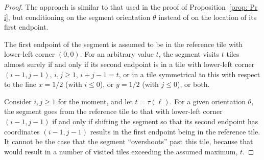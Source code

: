 \documentclass[12pt, a4paper]{article}
\newcommand{\funt}{\tau} %
\newcommand{\len}{\ell} %
\newcommand{\tiles}{t} %
\begin{document}
\begin{proof}
The approach is similar to that used in the proof of Proposition~\ref{prop: Pr i}, but conditioning on the segment orientation $\theta$ instead of on the location of its first endpoint.

The first endpoint of the segment is assumed to be in the reference tile with lower-left corner $(0,0)$. For an arbitrary value $\tiles$, the segment visits $\tiles$ tiles almost surely if and only if its second endpoint is in a tile with lower-left corner $(i-1,j-1)$, $i,j\geq 1$, $i+j-1=\tiles$, or in a tile symmetrical to this with respect to the line $x=1/2$ (with $i \leq 0$), or $y=1/2$ (with $j \leq 0$), or both.

Consider $i,j\geq 1$ for the moment, and let $\tiles = \funt(\len)$. For a given orientation $\theta$, the segment goes from the reference tile to that with lower-left corner $(i-1,j-1)$ if and only if shifting the segment so that its second endpoint has coordinates $(i-1,j-1)$ results in the first endpoint being in the reference tile. It cannot be the case that the segment ``overshoots'' past this tile, because that would result in a number of visited tiles exceeding the assumed maximum, $\tiles$.


\end{proof}
\end{document}
